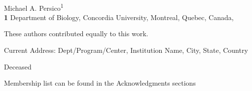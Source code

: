 \documentclass[
  10pt,
  letterpaper,
]{article}
\begin{document}
\vspace*{0.2in}

\begin{flushleft}
{\Large
\textbf{} %
}
\newline
\\
Michael A. Persico\textsuperscript{1}
\\
\bigskip
\textbf{1} Department of Biology, Concordia
University, Montreal, Quebec, Canada, 
\bigskip

% 
%
\Yinyang These authors contributed equally to this work.


\textcurrency Current Address: Dept/Program/Center, Institution Name, City, State, Country %

\dag Deceased

\textpilcrow Membership list can be found in the Acknowledgments
sections


\end{flushleft}
\end{document}
